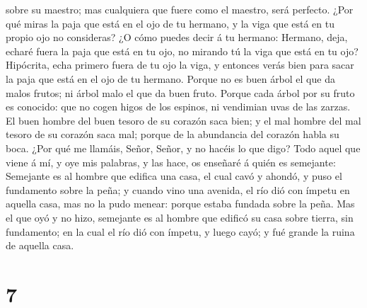 sobre su maestro; mas cualquiera que fuere como el maestro, será
perfecto.  ¿Por qué miras la paja que está en el ojo de tu
hermano, y la viga que está en tu propio ojo no consideras?
 ¿O cómo puedes decir á tu hermano: Hermano, deja, echaré
fuera la paja que está en tu ojo, no mirando tú la viga que está en tu
ojo? Hipócrita, echa primero fuera de tu ojo la viga, y entonces verás
bien para sacar la paja que está en el ojo de tu hermano. 
Porque no es buen árbol el que da malos frutos; ni árbol malo el que da
buen fruto.  Porque cada árbol por su fruto es conocido:
que no cogen higos de los espinos, ni vendimian uvas de las zarzas.
 El buen hombre del buen tesoro de su corazón saca bien; y
el mal hombre del mal tesoro de su corazón saca mal; porque de la
abundancia del corazón habla su boca.  ¿Por qué me llamáis,
Señor, Señor, y no hacéis lo que digo?  Todo aquel que
viene á mí, y oye mis palabras, y las hace, os enseñaré á quién es
semejante:  Semejante es al hombre que edifica una casa, el
cual cavó y ahondó, y puso el fundamento sobre la peña; y cuando vino
una avenida, el río dió con ímpetu en aquella casa, mas no la pudo
menear: porque estaba fundada sobre la peña.  Mas el que
oyó y no hizo, semejante es al hombre que edificó su casa sobre tierra,
sin fundamento; en la cual el río dió con ímpetu, y luego cayó; y fué
grande la ruina de aquella casa.

\hypertarget{section-6}{%
\section{7}\label{section-6}}

